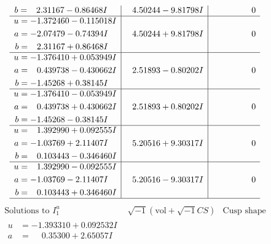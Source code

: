 \documentclass[1p]{elsarticle_modified}
\theoremstyle{definition}
\newcommand{\I}{\sqrt{-1}}
\begin{document}
$$\begin{array}{c|c|c}
\begin{aligned}
b &= \phantom{-}2.31167 - 0.86468 I\end{aligned}
 & \phantom{-}4.50244 - 9.81798 I & \phantom{-0.000000 } 0 \\ \hline\begin{aligned}
u &= -1.372460 - 0.115018 I \\
a &= -2.07479 - 0.74394 I \\
b &= \phantom{-}2.31167 + 0.86468 I\end{aligned}
 & \phantom{-}4.50244 + 9.81798 I & \phantom{-0.000000 } 0 \\ \hline\begin{aligned}
u &= -1.376410 + 0.053949 I \\
a &= \phantom{-}0.439738 - 0.430662 I \\
b &= -1.45268 + 0.38145 I\end{aligned}
 & \phantom{-}2.51893 - 0.80202 I & \phantom{-0.000000 } 0 \\ \hline\begin{aligned}
u &= -1.376410 - 0.053949 I \\
a &= \phantom{-}0.439738 + 0.430662 I \\
b &= -1.45268 - 0.38145 I\end{aligned}
 & \phantom{-}2.51893 + 0.80202 I & \phantom{-0.000000 } 0 \\ \hline\begin{aligned}
u &= \phantom{-}1.392990 + 0.092555 I \\
a &= -1.03769 + 2.11407 I \\
b &= \phantom{-}0.103443 - 0.346460 I\end{aligned}
 & \phantom{-}5.20516 + 9.30317 I & \phantom{-0.000000 } 0 \\ \hline\begin{aligned}
u &= \phantom{-}1.392990 - 0.092555 I \\
a &= -1.03769 - 2.11407 I \\
b &= \phantom{-}0.103443 + 0.346460 I\end{aligned}
 & \phantom{-}5.20516 - 9.30317 I & \phantom{-0.000000 } 0\\
 \hline 
 \end{array}$$\newpage$$\begin{array}{c|c|c}  
\text{Solutions to }I^u_{1}& \I (\text{vol} + \sqrt{-1}CS) & \text{Cusp shape}\\
 \hline 
\begin{aligned}
u &= -1.393310 + 0.092532 I \\
a &= \phantom{-}0.35300 + 2.65057 I \\

\end{aligned}
\end{array}$$
\end{document}
